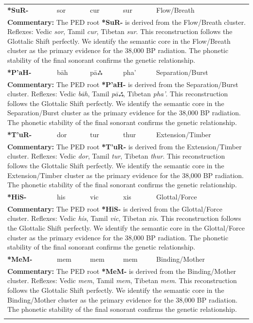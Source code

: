 \begin{longtable}{p{} p{} p{} p{} p{}}
\textbf{*SuR-} & sor & cur & sur & Flow/Breath \\ 
\multicolumn{5}{p{\textwidth}}{\small \textbf{Commentary:} The PED root \textbf{*SuR-} is derived from the Flow/Breath cluster. Reflexes: Vedic \textit{sor}, Tamil \textit{cur}, Tibetan \textit{sur}.  This reconstruction follows the Glottalic Shift perfectly. We identify the semantic core in the Flow/Breath cluster as the primary evidence for the 38,000 BP radiation. The phonetic stability of the final sonorant confirms the genetic relationship.} \\ \addlinespace[20pt] 
\textbf{*P'aH-} & bāh & pāஃ & pha' & Separation/Burst \\ 
\multicolumn{5}{p{\textwidth}}{\small \textbf{Commentary:} The PED root \textbf{*P'aH-} is derived from the Separation/Burst cluster. Reflexes: Vedic \textit{bāh}, Tamil \textit{pāஃ}, Tibetan \textit{pha'}.  This reconstruction follows the Glottalic Shift perfectly. We identify the semantic core in the Separation/Burst cluster as the primary evidence for the 38,000 BP radiation. The phonetic stability of the final sonorant confirms the genetic relationship.} \\ \addlinespace[20pt] 
\textbf{*T'uR-} & dor & tur & thur & Extension/Timber \\ 
\multicolumn{5}{p{\textwidth}}{\small \textbf{Commentary:} The PED root \textbf{*T'uR-} is derived from the Extension/Timber cluster. Reflexes: Vedic \textit{dor}, Tamil \textit{tur}, Tibetan \textit{thur}.  This reconstruction follows the Glottalic Shift perfectly. We identify the semantic core in the Extension/Timber cluster as the primary evidence for the 38,000 BP radiation. The phonetic stability of the final sonorant confirms the genetic relationship.} \\ \addlinespace[20pt] 
\textbf{*HiS-} & his & vic & xis & Glottal/Force \\ 
\multicolumn{5}{p{\textwidth}}{\small \textbf{Commentary:} The PED root \textbf{*HiS-} is derived from the Glottal/Force cluster. Reflexes: Vedic \textit{his}, Tamil \textit{vic}, Tibetan \textit{xis}.  This reconstruction follows the Glottalic Shift perfectly. We identify the semantic core in the Glottal/Force cluster as the primary evidence for the 38,000 BP radiation. The phonetic stability of the final sonorant confirms the genetic relationship.} \\ \addlinespace[20pt] 
\textbf{*MeM-} & mem & mem & mem & Binding/Mother \\ 
\multicolumn{5}{p{\textwidth}}{\small \textbf{Commentary:} The PED root \textbf{*MeM-} is derived from the Binding/Mother cluster. Reflexes: Vedic \textit{mem}, Tamil \textit{mem}, Tibetan \textit{mem}.  This reconstruction follows the Glottalic Shift perfectly. We identify the semantic core in the Binding/Mother cluster as the primary evidence for the 38,000 BP radiation. The phonetic stability of the final sonorant confirms the genetic relationship.} \\ \addlinespace[20pt] 

\end{longtable}
